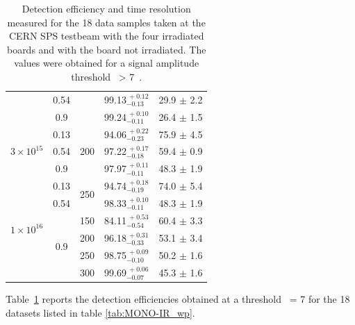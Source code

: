 \begin{table}[h]
\begin{tabular}{|c|c|c|c|c|}
			                                        & 0.54 &                        & 99.13$^{~\!+0.12}_{-0.13}$ & 29.9 $\pm$ 2.2\\ \cline{2-2} \cline{4-5}
			                                        & 0.9  &                        & 99.24$^{~\!+0.10}_{-0.11}$ & 26.4 $\pm$ 1.5\\ \cline{1-5} 
			\multirow{3}{*}{ $3 \times 10^{15}$ }   & 0.13 & \multirow{3}{*}{200}   & 94.06$^{~\!+0.22}_{-0.23}$ & 75.9 $\pm$ 4.5\\ \cline{2-2} \cline{4-5}
			                                        & 0.54 &                        & 97.22$^{~\!+0.17}_{-0.18}$ & 59.4 $\pm$ 0.9\\ \cline{2-2} \cline{4-5}
			                                        & 0.9  &                        & 97.97$^{~\!+0.11}_{-0.11}$ & 48.3 $\pm$ 1.9\\ \cline{1-5} 
			\multirow{6}{*}{ $1 \times 10^{16}$ }   & 0.13 & \multirow{2}{*}{250}   & 94.74$^{~\!+0.18}_{-0.19}$ & 74.0 $\pm$ 5.4\\ \cline{2-2} \cline{4-5}
			                                        & 0.54 &                        & 98.33$^{~\!+0.10}_{-0.11}$ & 48.3 $\pm$ 1.9\\ \cline{2-5}
			                    & \multirow{4}{*}{0.9}     & 150                    & 84.11$^{~\!+0.53}_{-0.54}$ & 60.4 $\pm$ 3.3\\ \cline{3-5} 
 			                                        &      & 200                    & 96.18$^{~\!+0.31}_{-0.33}$ & 53.1 $\pm$ 3.4\\ \cline{3-5}
                                        				&      & 250                    & 98.75$^{~\!+0.09}_{-0.10}$ & 50.2 $\pm$ 1.6\\ \cline{3-5}
                                       				&      & 300                    & 99.69$^{~\!+0.06}_{-0.07}$ & 45.3 $\pm$ 1.6\\ \cline{1-5}

			\end{tabular}
			\caption{Detection efficiency and time resolution measured for the 18 data samples taken at the CERN SPS testbeam with the four irradiated boards and with the board not irradiated. The values were obtained for a signal amplitude threshold \vth~> 7~\noise. }
			\label{tab:MONO-IR_effres} 
		\end{table}

		Table~\ref{tab:MONO-IR_effres} reports the detection efficiencies obtained at a threshold \vth~= 7 \noise for the 18 datasets listed in table \ref{tab:MONO-IR_wp}.  

